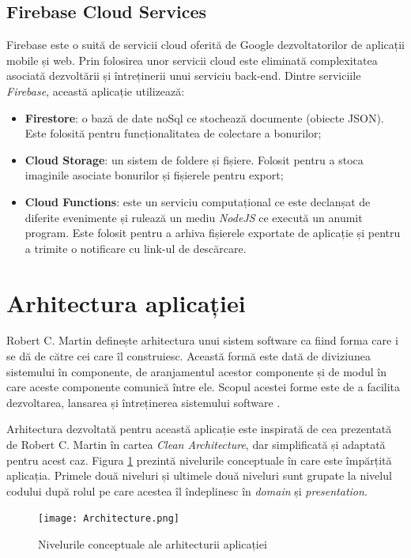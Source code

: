 \subsection{Firebase Cloud Services}

Firebase este o suită de servicii cloud oferită de Google dezvoltatorilor de aplicații mobile și web. Prin folosirea unor servicii cloud este eliminată complexitatea asociată dezvoltării și întreținerii unui serviciu back-end. Dintre serviciile \emph{Firebase}, această aplicație utilizează:

\begin{itemize}
\item
  \textbf{Firestore}: o bază de date noSql ce stochează documente (obiecte JSON). Este folosită pentru funcționalitatea de colectare a bonurilor;
\item
  \textbf{Cloud Storage}: un sistem de foldere și fișiere. Folosit pentru a stoca imaginile asociate bonurilor și fișierele pentru export;
\item
  \textbf{Cloud Functions}: este un serviciu computațional ce este declanșat de diferite evenimente și rulează un mediu \emph{NodeJS} ce execută un anumit program. Este folosit pentru a arhiva fișierele exportate de aplicație și pentru a trimite o notificare cu link-ul de descărcare.
\end{itemize}

\section{Arhitectura aplicației}

Robert C. Martin definește arhitectura unui sistem software ca fiind forma care i se dă de către cei care îl construiesc. Această formă este dată de diviziunea sistemului în componente, de aranjamentul acestor componente și de modul în care aceste componente comunică între ele. Scopul acestei forme este de a facilita dezvoltarea, lansarea și întreținerea sistemului software \cite{ArchitectureDef}.

Arhitectura dezvoltată pentru această aplicație este inspirată de cea prezentată de Robert C. Martin în cartea \emph{Clean Architecture}, dar simplificată și adaptată pentru acest caz. Figura \ref{fig:arhitectura} prezintă nivelurile conceptuale în care este împărțită aplicația. Primele două niveluri și ultimele două niveluri sunt grupate la nivelul codului după rolul pe care acestea îl îndeplinesc în \emph{domain} și \emph{presentation}.

\begin{figure}[h]
  \centering
  \texttt{[image: Architecture.png]}
  \caption{Nivelurile conceptuale ale arhitecturii aplicației
  \label{fig:arhitectura}}
\end{figure}

